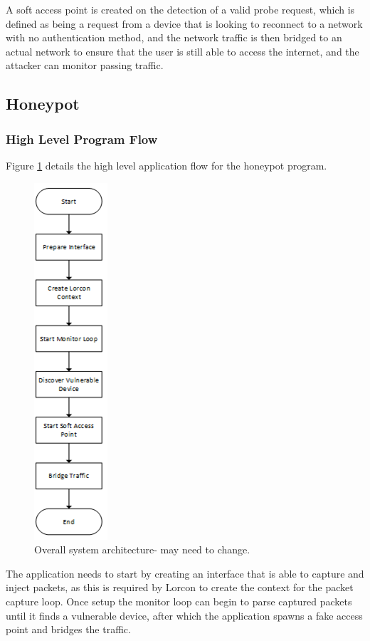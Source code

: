 A soft access point is created on the detection of a valid probe request, which is defined as being a request from a device that is looking to reconnect to a network with no authentication method, and the network traffic is then bridged to an actual network to ensure that the user is still able to access the internet, and the attacker can monitor passing traffic.

\subsection{Honeypot}
\subsubsection{High Level Program Flow}
\label{program-flow}
Figure \ref{fig:honeypot_flow} details the high level application flow for the honeypot program. 

\begin{figure}[h!]
\centering\includegraphics{design/figures/honeypot-flow.png}
\caption{Overall system architecture- may need to change.}
\label{fig:honeypot_flow}
\end{figure}

The application needs to start by creating an interface that is able to capture and inject packets, as this is required by Lorcon to create the context for the packet capture loop. Once setup the monitor loop can begin to parse captured packets until it finds a vulnerable device, after which the application spawns a fake access point and bridges the traffic.
\newpage
